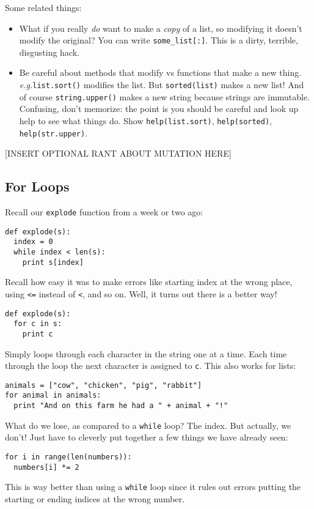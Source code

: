 \documentclass{article}
\newcommand{\eg}{\emph{e.g.}\xspace}
\begin{document}
Some related things:
\begin{itemize}
\item What if you really \emph{do} want to make a \emph{copy} of a
  list, so modifying it doesn't modify the original?  You can write
  \verb|some_list[:]|.  This is a dirty, terrible, disgusting hack.
\item Be careful about methods that modify vs functions that make a
  new thing.  \eg \verb|list.sort()| modifies the list.  But
  \verb|sorted(list)| makes a new list!  And of course
  \verb|string.upper()| makes a new string because strings are
  immutable.  Confusing, don't memorize: the point is you should be
  careful and look up help to see what things do.  Show
  \verb|help(list.sort)|, \verb|help(sorted)|, \verb|help(str.upper)|.
\end{itemize}

[INSERT OPTIONAL RANT ABOUT MUTATION HERE]

\subsection*{For Loops}

Recall our \verb|explode| function from a week or two ago:
\begin{verbatim}
def explode(s):
  index = 0
  while index < len(s):
    print s[index]
\end{verbatim}
Recall how easy it was to make errors like starting index at the wrong
place, using \verb|<=| instead of \verb|<|, and so on.  Well, it turns
out there is a better way!
\begin{verbatim}
def explode(s):
  for c in s:
    print c
\end{verbatim}
Simply loops through each character in the string one at a time.  Each
time through the loop the next character is assigned to \verb|c|.
This also works for lists:
\begin{verbatim}
animals = ["cow", "chicken", "pig", "rabbit"]
for animal in animals:
  print "And on this farm he had a " + animal + "!"
\end{verbatim}
What do we lose, as compared to a \verb|while| loop?  The index. But
actually, we don't!  Just have to cleverly put together a few things
we have already seen:
\begin{verbatim}
for i in range(len(numbers)):
  numbers[i] *= 2
\end{verbatim}
This is way better than using a \verb|while| loop since it rules out
errors putting the starting or ending indices at the wrong number.
\end{document}
